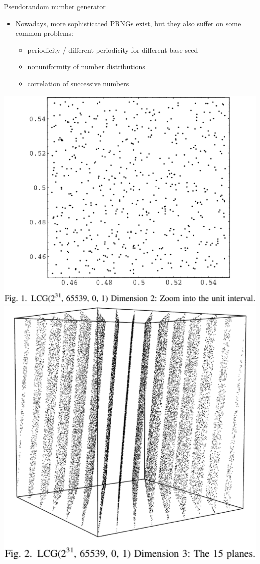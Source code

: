 \begin{slide}[toc=]{Pseudorandom number generator}
\null\vfill

  \begin{itemize}
    \item Nowadays, more sophisticated PRNGs exist, but they also suffer on some common problems:
    \begin{itemize}
      \item periodicity / different periodicity for different base seed
      \item nonuniformity of number distributions
      \item correlation of successive numbers
    \end{itemize}
  \end{itemize}

  \twocolumn
  {
    \includegraphics[width=\columnwidth]{figures/random2d.eps}
  }
  {
    \includegraphics[width=\columnwidth]{figures/random3d.eps}
}
\end{slide}
